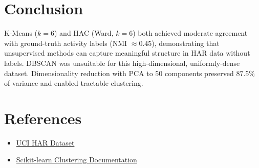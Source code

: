 \documentclass[11pt]{article}
\begin{document}
\section*{Conclusion}
K-Means ($k=6$) and HAC (Ward, $k=6$) both achieved moderate agreement with ground-truth activity labels (NMI $\approx 0.45$), demonstrating that unsupervised methods can capture meaningful structure in HAR data without labels. DBSCAN was unsuitable for this high-dimensional, uniformly-dense dataset. Dimensionality reduction with PCA to 50 components preserved 87.5\% of variance and enabled tractable clustering.

\section*{References}
\begin{itemize}
    \item \href{https://archive.ics.uci.edu/dataset/240/human+activity+recognition+using+smartphones}{UCI HAR Dataset}
    \item \href{https://scikit-learn.org/stable/modules/clustering.html}{Scikit-learn Clustering Documentation}
\end{itemize}
\end{document}
